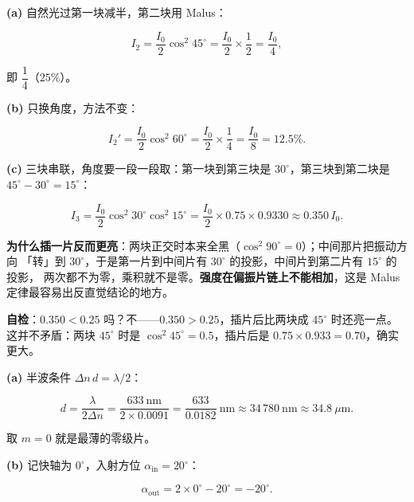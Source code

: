 \documentclass[11pt]{ctexart}
\let\hdrorig\hdr
\renewcommand{\hdr}[2]{\needspace{8\baselineskip}\hdrorig{#1}{#2}}
\begin{document}


\textbf{(a)} 自然光过第一块减半，第二块用 Malus：

\[
I_2=\frac{I_0}{2}\cos^2 45^\circ=\frac{I_0}{2}\times\frac12=\frac{I_0}{4},
\]

即 $\dfrac14$（$25\%$）。

\textbf{(b)} 只换角度，方法不变：

\[
I_2'=\frac{I_0}{2}\cos^2 60^\circ=\frac{I_0}{2}\times\frac14=\frac{I_0}{8}=12.5\%.
\]

\textbf{(c)} 三块串联，角度要一段一段取：第一块到第三块是 $30^\circ$，第三块到第二块是 $45^\circ-30^\circ=15^\circ$：

\[
I_3=\frac{I_0}{2}\cos^2 30^\circ\cos^2 15^\circ
=\frac{I_0}{2}\times0.75\times0.9330\approx0.350\,I_0 .
\]

\textbf{为什么插一片反而更亮}：两块正交时本来全黑（$\cos^2 90^\circ=0$）；中间那片把振动方向
「转」到 $30^\circ$，于是第一片到中间片有 $30^\circ$ 的投影，中间片到第二片有 $15^\circ$ 的投影，
两次都不为零，乘积就不是零。\textbf{强度在偏振片链上不能相加}，这是 Malus 定律最容易出反直觉结论的地方。

\textbf{自检}：$0.350<0.25$ 吗？不——$0.350>0.25$，插片后比两块成 $45^\circ$ 时还亮一点。
这并不矛盾：两块 $45^\circ$ 时是 $\cos^2 45^\circ=0.5$，插片后是 $0.75\times0.933=0.70$，确实更大。


\textbf{(a)} 半波条件 $\Delta n\,d=\lambda/2$：

\[
d=\frac{\lambda}{2\Delta n}=\frac{633\ \mathrm{nm}}{2\times0.0091}
=\frac{633}{0.0182}\ \mathrm{nm}\approx34\,780\ \mathrm{nm}\approx34.8\ \mu\mathrm{m}.
\]

取 $m=0$ 就是最薄的零级片。

\textbf{(b)} 记快轴为 $0^\circ$，入射方位 $\alpha_{\text{in}}=20^\circ$：

\[
\alpha_{\text{out}}=2\times0^\circ-20^\circ=-20^\circ .
\]
\end{document}
